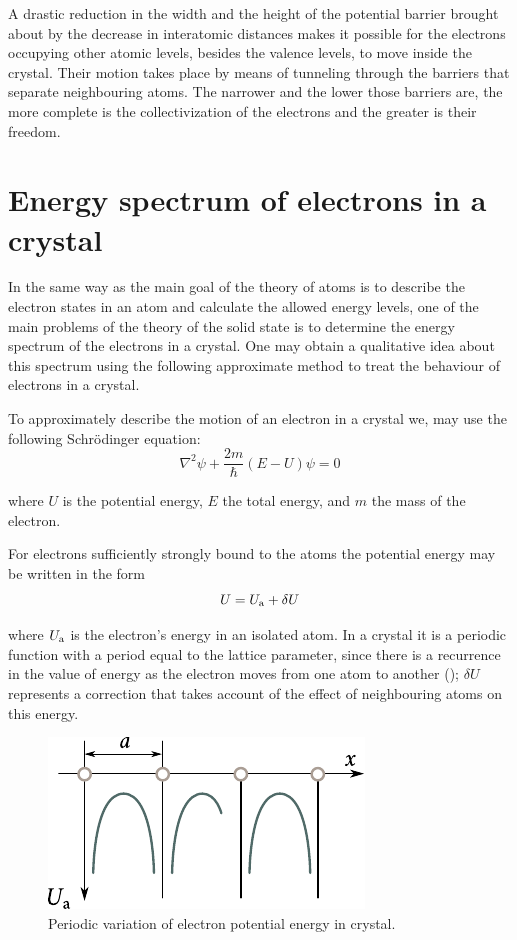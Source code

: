 A drastic reduction in the width and the height of the potential barrier brought about by the decrease in interatomic distances makes it possible for the electrons occupying other atomic levels, besides the valence levels, to move inside the crystal. Their motion takes place by means of tunneling through the barriers that separate neighbouring atoms. The narrower and the lower those barriers are, the more complete is the collectivization of the electrons and the greater is
their freedom.

\section{Energy spectrum of electrons in a crystal}\label{sec:39}

In the same way as the main goal of the theory of atoms is to describe the electron states in an atom and calculate the allowed energy levels, one of the main problems of the theory of the solid state is to determine the energy spectrum of the electrons in a crystal. One may obtain a qualitative idea about this spectrum using the following approximate method to treat the behaviour of electrons in a crystal.

To approximately describe the motion of an electron in a crystal we, may use the following Schr\"odinger equation:
\begin{equation}\label{eq:5_5}
    \nabla^2{\psi} + \frac{2m}{\hslash} (E-U) \psi = 0
\end{equation}

\noindent
where $U$ is the potential energy, $E$ the total energy, and $m$ the mass of the electron.

For electrons sufficiently strongly bound to the atoms the potential energy may be written in the form
\begin{equation}\label{eq:5_6}
    U = U_{\text{a}} + \delta{U}
\end{equation}

\noindent
where $U_{\text{a}}$ is the electron's energy in an isolated atom. In a crystal it is a periodic function with a period equal to the lattice parameter, since there is a recurrence in the value of energy as the electron moves from one atom to another (); $\delta{U}$ represents a correction that takes account of the effect of neighbouring atoms on this energy.

\begin{figure}[t]
	\begin{center}
		\includegraphics[scale=0.98]{figures/ch_05/fig_5_4.pdf}
		\caption[]{Periodic variation of electron potential energy in crystal.}
		\label{fig:5_4}
	\end{center}
	\vspace{-0.7cm}
\end{figure}

